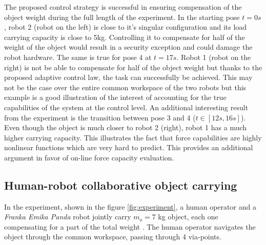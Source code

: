 The proposed control strategy is successful in ensuring  compensation of the object weight during the full length of the experiment. In the starting pose $t=0s$, robot 2 (robot on the left) is close to it's singular configuration and its load carrying capacity is close to 5kg. Controlling it to compensate for half of the weight of the object would result in a security exception and could damage the robot hardware. The same is true for pose 4 at $t=17s$. Robot 1 (robot on the right) is not be able to compensate for half of the object weight but thanks to the proposed adaptive control law, the task can successfully be achieved. This may not be the case over the entire common workspace of the two robots but this example is a good illustration of the interest of accounting for the true capabilities of the system at the control level.  An additional interesting result from the experiment is the transition between pose 3 and 4 ($t \in [12s,16s]$). Even though the object is much closer to robot 2 (right), robot 1 has a much higher carrying capacity. This illustrates the fact that force capabilities are highly nonlinear functions which are very hard to predict. This provides an additional argument in favor of on-line force capacity evaluation. 


\subsection{Human-robot collaborative object carrying}
\label{ch:human_robot_carrying}
In the experiment, shown in the figure \ref{fig:experiment}, a human operator and a \textit{Franka Emika Panda} robot jointly carry $m_o\!=\!7$ kg object, each one compensating for a part of the total weight . The human operator  navigates the object through the common workspace, passing through  4 via-points. 




